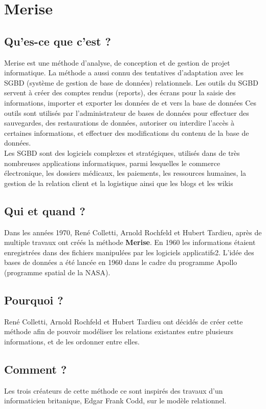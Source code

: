 \documentclass{article}
\begin{document}
\section{Merise}\label{merise}


\subsection{Qu'es-ce que c'est ?}\label{ques-ce-que-cest}

Merise est une méthode d'analyse, de conception et de gestion de projet
informatique. La méthode a aussi connu des tentatives d'adaptation avec
les SGBD (système de gestion de base de données) relationnels. Les
outils du SGBD servent à créer des comptes rendus (reports), des écrans
pour la saisie des informations, importer et exporter les données de et
vers la base de données Ces outils sont utilisés par l'administrateur de
bases de données pour effectuer des sauvegardes, des restaurations de
données, autoriser ou interdire l'accès à certaines informations, et
effectuer des modifications du contenu de la base de données.\\
Les SGBD sont des logiciels complexes et stratégiques, utilisés dans de
très nombreuses applications informatiques, parmi lesquelles le commerce
électronique, les dossiers médicaux, les paiements, les ressources
humaines, la gestion de la relation client et la logistique ainsi que
les blogs et les wikis


\subsection{Qui et quand ?}\label{qui-et-quand}

Dans les années 1970, René Colletti, Arnold Rochfeld et Hubert Tardieu,
après de multiple travaux ont créés la méthode \textbf{Merise}. En 1960
les informations étaient enregistrées dans des fichiers manipulées par
les logiciels applicatifs2. L'idée des bases de données a été lancée en
1960 dans le cadre du programme Apollo (programme spatial de la NASA).


\subsection{Pourquoi ?}\label{pourquoi}

René Colletti, Arnold Rochfeld et Hubert Tardieu ont décidés de créer
cette méthode afin de pouvoir modéliser les relations existantes entre
plusieurs informations, et de les ordonner entre elles.


\subsection{Comment ?}\label{comment}

Les trois créateurs de cette méthode ce sont inspirés des travaux d'un
informaticien britanique, Edgar Frank Codd, sur le modèle relationnel.
\end{document}

